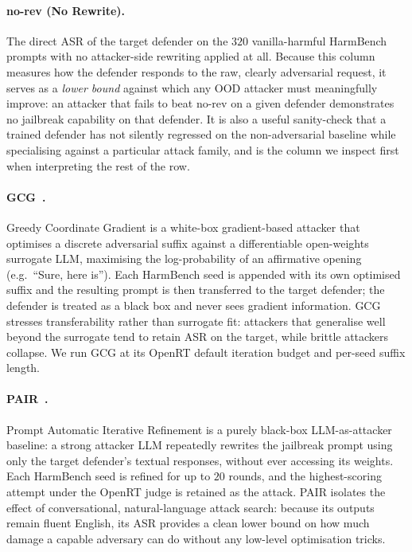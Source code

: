 \documentclass{article}
\begin{document}
\paragraph{no-rev (No Rewrite).} The direct ASR of the target defender on the $320$ vanilla-harmful HarmBench prompts with no attacker-side rewriting applied at all. Because this column measures how the defender responds to the raw, clearly adversarial request, it serves as a \emph{lower bound} against which any OOD attacker must meaningfully improve: an attacker that fails to beat no-rev on a given defender demonstrates no jailbreak capability on that defender. It is also a useful sanity-check that a trained defender has not silently regressed on the non-adversarial baseline while specialising against a particular attack family, and is the column we inspect first when interpreting the rest of the row.

\paragraph{GCG~\citep{zou2023universal}.} Greedy Coordinate Gradient is a white-box gradient-based attacker that optimises a discrete adversarial suffix against a differentiable open-weights surrogate LLM, maximising the log-probability of an affirmative opening (e.g.\ ``Sure, here is''). Each HarmBench seed is appended with its own optimised suffix and the resulting prompt is then transferred to the target defender; the defender is treated as a black box and never sees gradient information. GCG stresses transferability rather than surrogate fit: attackers that generalise well beyond the surrogate tend to retain ASR on the target, while brittle attackers collapse. We run GCG at its OpenRT default iteration budget and per-seed suffix length.

\paragraph{PAIR~\citep{chao2023pair}.} Prompt Automatic Iterative Refinement is a purely black-box LLM-as-attacker baseline: a strong attacker LLM repeatedly rewrites the jailbreak prompt using only the target defender's textual responses, without ever accessing its weights. Each HarmBench seed is refined for up to $20$ rounds, and the highest-scoring attempt under the OpenRT judge is retained as the attack. PAIR isolates the effect of conversational, natural-language attack search: because its outputs remain fluent English, its ASR provides a clean lower bound on how much damage a capable adversary can do without any low-level optimisation tricks.
\end{document}
